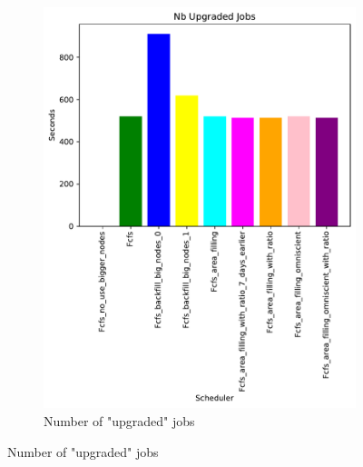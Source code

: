 \documentclass[a4paper]{article}
\begin{document}
\begin{figure}[H]
\begin{subfigure}[b]{0.4\linewidth}\centering\includegraphics[width=0.95\linewidth]{MBSS/plot/Size_Constraint_2022-01-17->2022-01-17_V10000_Nb_Upgraded_Jobs_450_128_32_256_4_1024.pdf}\caption{Number of "upgraded" jobs}\label{45}\end{subfigure}

\end{figure}
\end{document}

